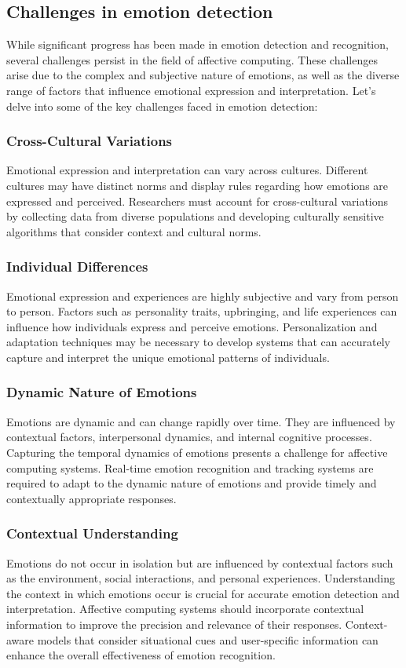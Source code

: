 \subsection{Challenges in emotion detection}
While significant progress has been made in emotion detection and recognition, several challenges persist in the field of affective computing.
These challenges arise due to the complex and subjective nature of emotions, as well as the diverse range of factors that influence emotional expression and interpretation. 
Let's delve into some of the key challenges faced in emotion detection:
\subsubsection{Cross-Cultural Variations}\label{sec:cross-cultural-variations}
Emotional expression and interpretation can vary across cultures. 
Different cultures may have distinct norms and display rules regarding how emotions are expressed and perceived. 
Researchers must account for cross-cultural variations by collecting data from diverse populations and developing culturally 
sensitive algorithms that consider context and cultural norms.
\subsubsection{Individual Differences}\label{sec:Individual-differences}
Emotional expression and experiences are highly subjective and vary from person to person. 
Factors such as personality traits, upbringing, and life experiences can influence how individuals express and perceive emotions.
Personalization and adaptation techniques may be necessary to develop systems that can accurately capture and interpret the unique emotional patterns of individuals.
\subsubsection{Dynamic Nature of Emotions}
Emotions are dynamic and can change rapidly over time. They are influenced by contextual factors, interpersonal dynamics, and internal cognitive processes. Capturing the temporal dynamics of emotions presents a challenge for affective computing systems. 
Real-time emotion recognition and tracking systems are required to adapt to the dynamic nature of emotions and provide timely and contextually appropriate responses.
\subsubsection{Contextual Understanding}
Emotions do not occur in isolation but are influenced by contextual factors such as the environment, social interactions, and personal experiences. Understanding the context in which emotions occur is crucial for accurate emotion detection and interpretation. Affective computing systems should incorporate contextual information to improve the precision and relevance of their responses. 
Context-aware models that consider situational cues and user-specific information can enhance the overall effectiveness of emotion recognition.

